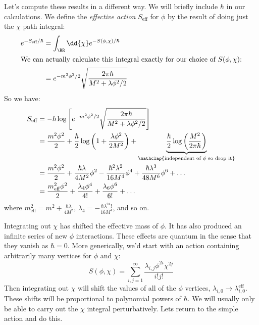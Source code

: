 \documentclass{jknotes}
\begin{document}
Let's compute these results in a different way. We will briefly include \(\hbar\) in our calculations. We define the \emph{effective action} \(S_{\text{eff}}\) for \(\phi\) by the result of doing just the \(\chi\) path integral:
\begin{align}
    e^{-S_{\text{eff}}/\hbar} &= \int_\RR\dd{\chi} e^{-S(\phi,\chi)/\hbar}\\
    \intertext{We can actually calculate this integral exactly for our choice of \(S(\phi,\chi)\):}
    &= e^{-m^2\phi^2/2} \sqrt{\frac{2\pi\hbar}{M^2+\lambda\phi^2/2}}
\end{align}
So we have:
\begin{align}
    S_{\text{eff}} &= - \hbar\log\left[ e^{-m^2\phi^2/2} \sqrt{\frac{2\pi\hbar}{M^2+\lambda\phi^2/2}} \right] \\
    &= \frac{m^2\phi^2}{2} + \frac{\hbar}{2}\log\left( 1 + \frac{\lambda\phi^2}{2M^2} \right) + \underbrace{\frac{\hbar}{2}\log\left( \frac{M^2}{2\pi\hbar} \right)}_{\mathclap{\text{independent of \(\phi\) so drop it}}}\\
    &= \frac{m^2\phi^2}{2} + \frac{\hbar\lambda}{4M^2}\phi^2 - \frac{\hbar^2\lambda^2}{16M^4}\phi^4 + \frac{\hbar\lambda^3}{48M^6}\phi^6 + \dots\\
    &= \frac{m^2_{\text{eff}}\phi^2}{2} + \frac{\lambda_4\phi^4}{4!} + \frac{\lambda_6\phi^6}{6!} + \dots
\end{align}
where \(m^2_{\text{eff}} = m^2 + \frac{\hbar\lambda}{4M^2}\), \(\lambda_4 = - \frac{\hbar\lambda^24!}{16M^4}\), and so on.

Integrating out \(\chi\) has shifted the effective mass of \(\phi\). It has also produced an infinite series of new \(\phi\) interactions. These effects are quantum in the sense that they vanish as \(\hbar = 0\). More generically, we'd start with an action containing arbitrarily many vertices for \(\phi\) and \(\chi\):
\begin{equation}
    S(\phi,\chi) = \sum_{i,j=1}^\infty \frac{\lambda_{i,j}\phi^{2i}\chi^{2j}}{i!j!}
\end{equation}
Then integrating out \(\chi\) will shift the values of all of the \(\phi\) vertices, \(\lambda_{i,0} \rightarrow \lambda_{i,0}^{\text{eff}}\). These shifts will be proportional to polynomial powers of \(\hbar\). We will usually only be able to carry out the \(\chi\) integral perturbatively. Lets return to the simple action and do this.
\end{document}
